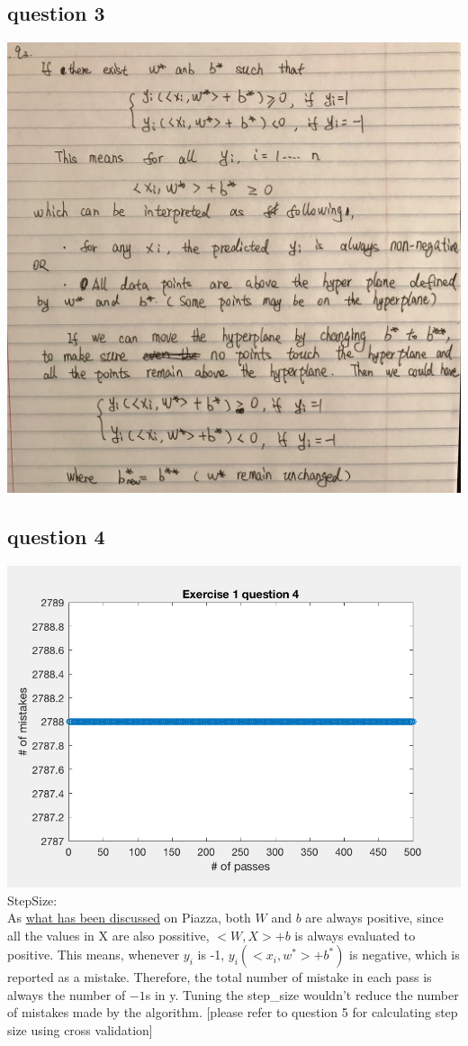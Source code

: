 \documentclass[11pt]{article} %
\begin{document}
\subsection{question 3}
\includegraphics[scale=0.2]{e1q3.jpeg}
\subsection{question 4}
\includegraphics[scale=1]{e1q4}
StepSize: \\
As \href{https://piazza.com/class/j6y0higvsx37d0?cid=26}{what has been discussed} on Piazza, both $W$ and $b$ are always positive, since all the values in X are also possitive, $<W,X>+b$ is always evaluated to positive. This means, whenever $y_{i}$ is -1, $y_{i}(<x_{i}, w^{*}> + b^{*})$ is negative, which is reported as a mistake. Therefore, the total number of mistake in each pass is always the number of $-1$s in y. Tuning the step\_size wouldn't reduce the number of mistakes made by the algorithm. [please refer to question 5 for calculating step size using cross validation]
\end{document}
